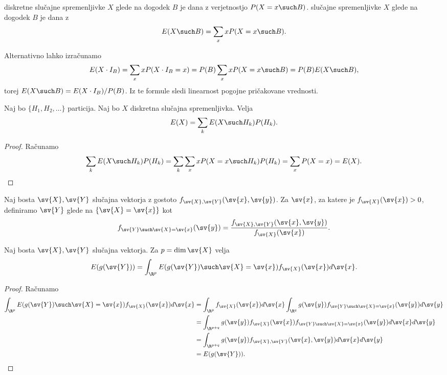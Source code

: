 
\begin{definicija}
   diskretne slučajne spremenljivke $X$ glede na
  dogodek $B$ je dana z verjetnostjo $P(X=x \such B)$.
   slučajne spremenljivke $X$ glede na
  dogodek $B$ je dana z
  \[
	E(X \such B) = \sum_x x P(X = x \such B).
  \]
\end{definicija}

Alternativno lahko izračunamo
\[
  E(X \cdot I_B) = \sum_x x P(X \cdot I_B = x)
  = P(B) \sum_x x P(X = x \such B) = P(B) E(X \such B),
\]
torej $E(X \such B) = E(X \cdot I_B) / P(B)$.
Iz te formule sledi linearnost pogojne pričakovane vrednosti.


\begin{izrek}
  Naj bo $\{H_1, H_2, \ldots\}$ particija.
  Naj bo $X$ diskretna slučajna spremenljivka.
  Velja
  \[
	E(X) = \sum_k E(X \such H_k) P(H_k).
  \]
\end{izrek}

\begin{proof}
  Računamo
  \[
	\sum_k E(X \such H_k) P(H_k)
	= \sum_k \sum_x x P(X = x \such H_k) P(H_k)
	= \sum_x P(X = x)
	= E(X).
  \]
\end{proof}


\begin{definicija}
  Naj bosta $\sv{X}, \sv{Y}$ slučajna vektorja z gostoto
  $f_{\sv{X},\sv{Y}}(\sv{x},\sv{y})$.
  Za $\sv{x}$, za katere je $f_{\sv{X}}(\sv{x}) > 0$, definiramo  $\sv{Y}$ glede na $\{\sv{X} = \sv{x}\}$ kot
  \[
	f_{\sv{Y} \such \sv{X} = \sv{x}} (\sv{y})
	= \frac{f_{\sv{X},\sv{Y}}(\sv{x},\sv{y})}{f_{\sv{X}}(\sv{x})}.
  \]
\end{definicija}


\begin{izrek}
  Naj bosta $\sv{X}, \sv{Y}$ slučajna vektorja.
  Za $p = \dim \sv{X}$ velja
  \[
	E(g(\sv{Y})) = \int_{\R^p} E(g(\sv{Y}) \such \sv{X} = \sv{x})
	f_{\sv{X}}(\sv{x}) d\sv{x}.
  \]
\end{izrek}

\begin{proof}
  Računamo
  \begin{align*}
	\int_{\R^p} E(g(\sv{Y}) \such \sv{X} = \sv{x}) f_{\sv{X}}(\sv{x}) d\sv{x}
	&= \int_{\R^p} f_{\sv{X}}(\sv{x}) d\sv{x} \int_{\R^q} g(\sv{y}) f_{\sv{Y} \such \sv{X} = \sv{x}}(\sv{y}) d\sv{y} \\
	&= \int_{\R^{p+q}} g(\sv{y}) f_{\sv{X}}(\sv{x}) f_{\sv{Y} \such \sv{X} = \sv{x}}(\sv{y}) d\sv{x} d\sv{y} \\
	&= \int_{\R^{p+q}} g(\sv{y}) f_{\sv{X},\sv{Y}}(\sv{x},\sv{y}) d\sv{x} d\sv{y} \\
	&= E(g(\sv{Y})).
  \end{align*}
\end{proof}

